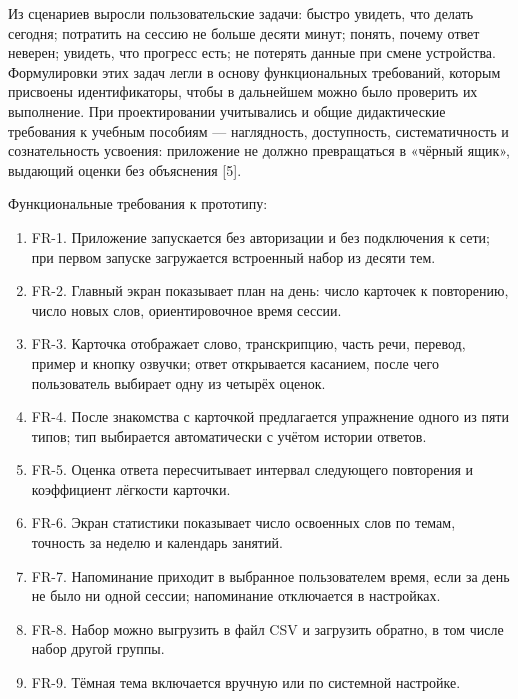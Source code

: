 \documentclass[11pt,a4paper,openany]{report}
\begin{document}
Из сценариев выросли пользовательские задачи: быстро увидеть, что делать сегодня; потратить на сессию не больше десяти минут; понять, почему ответ неверен; увидеть, что прогресс есть; не потерять данные при смене устройства. Формулировки этих задач легли в основу функциональных требований, которым присвоены идентификаторы, чтобы в дальнейшем можно было проверить их выполнение. При проектировании учитывались и общие дидактические требования к учебным пособиям — наглядность, доступность, систематичность и сознательность усвоения: приложение не должно превращаться в «чёрный ящик», выдающий оценки без объяснения [5].

Функциональные требования к прототипу:

\begin{enumerate}

  \item FR-1. Приложение запускается без авторизации и без подключения к сети; при первом запуске загружается встроенный набор из десяти тем.

  \item FR-2. Главный экран показывает план на день: число карточек к повторению, число новых слов, ориентировочное время сессии.

  \item FR-3. Карточка отображает слово, транскрипцию, часть речи, перевод, пример и кнопку озвучки; ответ открывается касанием, после чего пользователь выбирает одну из четырёх оценок.

  \item FR-4. После знакомства с карточкой предлагается упражнение одного из пяти типов; тип выбирается автоматически с учётом истории ответов.

  \item FR-5. Оценка ответа пересчитывает интервал следующего повторения и коэффициент лёгкости карточки.

  \item FR-6. Экран статистики показывает число освоенных слов по темам, точность за неделю и календарь занятий.

  \item FR-7. Напоминание приходит в выбранное пользователем время, если за день не было ни одной сессии; напоминание отключается в настройках.

  \item FR-8. Набор можно выгрузить в файл CSV и загрузить обратно, в том числе набор другой группы.

  \item FR-9. Тёмная тема включается вручную или по системной настройке.

\end{enumerate}
\end{document}
